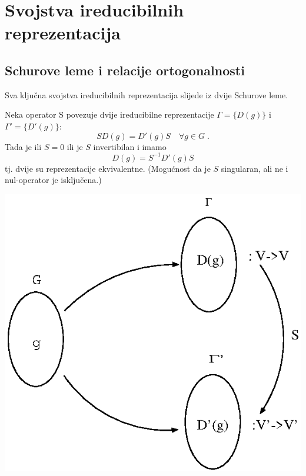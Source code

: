 


\chapter{Svojstva ireducibilnih reprezentacija}

\section{Schurove leme i relacije ortogonalnosti}

Sva ključna svojstva ireducibilnih reprezentacija slijede iz 
dvije Schurove leme.

\begin{teorem}
Neka operator S povezuje dvije  ireducibilne
reprezentacije $\Gamma=\{D(g)\}$ i $\Gamma'=\{D'(g)\}$:
\begin{displaymath}
  SD(g)=D'(g)S  \quad \forall g\in G  \;.
\end{displaymath}
Tada je ili $S=0$ ili je $S$ invertibilan i imamo
\begin{displaymath}
D(g)=S^{-1}D'(g)S
\end{displaymath}
tj. dvije su reprezentacije ekvivalentne. (Mogućnost
da je $S$ singularan, ali ne i nul-operator je isključena.)
\end{teorem}

\centerline{\includegraphics[scale=0.8]{pics/schur.eps}}

